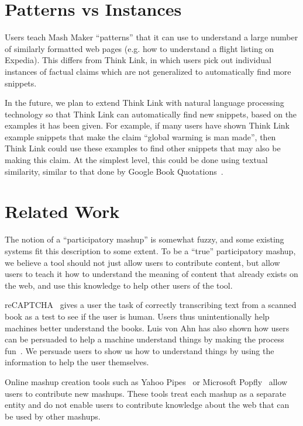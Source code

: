 \documentclass{chi2009}
\begin{document}
\section{Patterns vs Instances}

Users teach Mash Maker ``patterns'' that it can use to understand a large number of similarly formatted web pages (e.g. how to understand a flight listing on Expedia). This differs from Think Link, in which users pick out individual instances of factual claims which are not generalized to automatically find more snippets.

In the future, we plan to extend Think Link with natural language processing technology so that Think Link can automatically find new snippets, based on the examples it has been given. For example, if many users have shown Think Link example snippets that make the claim ``global warming is man made'', then Think Link could use these examples to find other snippets that may also be making this claim. At the simplest level, this could be done using textual similarity, similar to that done by Google Book Quotations~\cite{quotations}.


\section{Related Work}

The notion of a ``participatory mashup'' is somewhat fuzzy, and some existing systems fit this description to some extent. To be a ``true'' participatory mashup, we believe a tool should not just allow users to contribute content, but allow users to teach it how to understand the meaning of content that already exists on the web, and use this knowledge to help other users of the tool.

reCAPTCHA~\cite{recaptcha} gives a user the task of correctly transcribing text from a scanned book as a test to see if the user is human. Users thus unintentionally help machines better understand the books. Luis von Ahn has also shown how users can be persuaded to help a machine understand things by making the process fun~\cite{vonahn}. We persuade users to show us how to understand things by using the information to help the user themselves.

Online mashup creation tools such as Yahoo Pipes~\cite{pipes} or Microsoft Popfly~\cite{popfly} allow users to contribute new mashups. These tools treat each mashup as a separate entity and do not enable users to contribute knowledge about the web that can be used by other mashups.
\end{document}
